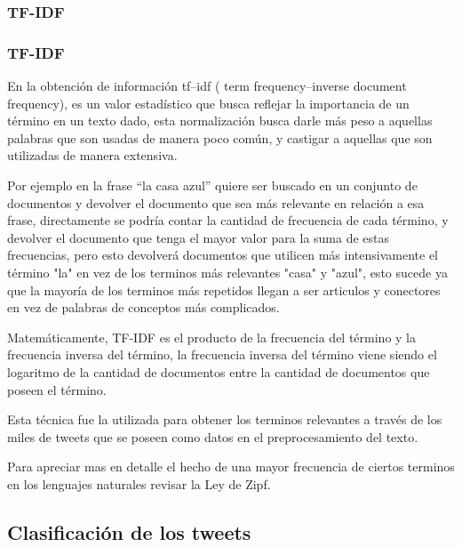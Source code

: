 \documentclass{beamer}
\begin{document}
\subsubsection{TF-IDF}
\begin{frame}
\frametitle{TF-IDF}
En la obtenci\'{o}n de informaci\'{o}n tf–idf ( term frequency–inverse document frequency), es un valor estad\'{i}stico que busca reflejar la importancia de un t\'{e}rmino en un texto dado,  esta normalizaci\'{o}n busca darle m\'{a}s peso a aquellas palabras que son usadas de manera poco común, y castigar a aquellas que son utilizadas de manera extensiva. \\
\end{frame}
\begin{frame}
Por ejemplo en la frase “la casa azul” quiere ser buscado en un conjunto de documentos y devolver el documento que sea m\'{a}s relevante en relaci\'{o}n a esa frase, directamente se podr\'{i}a contar la cantidad de frecuencia de cada t\'{e}rmino, y devolver el documento que tenga el mayor valor para la suma de estas frecuencias, pero esto devolver\'{a} documentos que utilicen m\'{a}s intensivamente el t\'{e}rmino "la" en vez de los terminos m\'{a}s relevantes "casa" y "azul", esto sucede ya que la mayor\'{i}a de los terminos m\'{a}s repetidos llegan a ser articulos y conectores en vez de palabras de conceptos m\'{a}s complicados. \\
\end{frame}
\begin{frame}
Matem\'{a}ticamente, TF-IDF es el producto de la frecuencia del t\'{e}rmino y la frecuencia inversa del t\'{e}rmino, la frecuencia inversa del t\'{e}rmino viene siendo el logaritmo de la cantidad de documentos entre la cantidad de documentos que poseen el t\'{e}rmino.
 
Esta t\'{e}cnica fue la utilizada para obtener los terminos relevantes a trav\'{e}s de los miles de tweets que se poseen como datos en el preprocesamiento del texto. 
 
Para apreciar mas en detalle el hecho de una mayor frecuencia de ciertos terminos en los lenguajes naturales  revisar la Ley de Zipf.
\end{frame}




\subsection{Clasificaci\'{o}n de los tweets}
\end{document}
